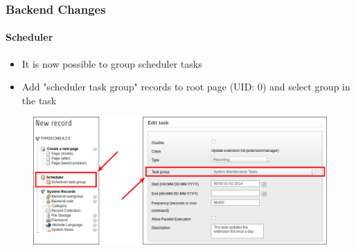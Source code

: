 \begin{frame}[fragile]
	\frametitle{Backend Changes}
	\framesubtitle{Scheduler}

	\begin{itemize}
		\item It is now possible to group scheduler tasks
		\item Add "scheduler task group" records to root page (UID: 0)\newline
			and select group in the task
	\end{itemize}

	\begin{figure}
		\includegraphics[width=0.85\linewidth]{Images/BackendChanges/SchedulerTaskGroup.png}
	\end{figure}

\end{frame}


